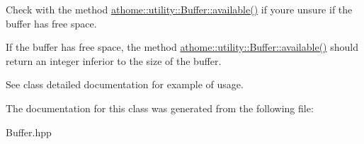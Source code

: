 Check with the method \mbox{\hyperlink{classathome_1_1utility_1_1_buffer_a2c441e74e8e325e8eb6cfb7ffb04b157}{athome\+::utility\+::\+Buffer\+::available()}} if you\textquotesingle{}re unsure if the buffer has free space.

If the buffer has free space, the method \mbox{\hyperlink{classathome_1_1utility_1_1_buffer_a2c441e74e8e325e8eb6cfb7ffb04b157}{athome\+::utility\+::\+Buffer\+::available()}} should return an integer inferior to the size of the buffer.

See class detailed documentation for example of usage. 

The documentation for this class was generated from the following file\+:\begin{DoxyCompactItemize}
\item 
Buffer.\+hpp\end{DoxyCompactItemize}
